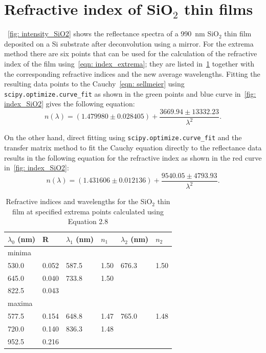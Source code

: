 \section{Refractive index of SiO\texorpdfstring{$_{2}$}{2} thin films}\label{sec: results_index_SiO2}
~\ref{fig: intensity_SiO2} shows the reflectance spectra of a \qty{990}{\nano\meter} SiO$_2$ thin film deposited on a Si substrate after deconvolution using a mirror. For the extrema method there are six points that can be used for the calculation of the refractive index of the film using~\ref{eqn: index_extrema}; they are listed in~\ref{tab: oscillation_SiO2} together with the corresponding refractive indices and the new average wavelengths. Fitting the resulting data points to the Cauchy~\ref{eqn: sellmeier} using \verb|scipy.optimize.curve_fit| as shown in the green points and blue curve in~\ref{fig: index_SiO2} gives the following equation:
\begin{equation} \label{eqn:SiO2_extrema_cauchy} 
    n(\lambda) = (1.479980\pm0.028405) + \frac{3669.94\pm13332.23}{\lambda^2}.
\end{equation}

On the other hand, direct fitting using \verb|scipy.optimize.curve_fit| and the transfer matrix method to fit the Cauchy equation directly to the reflectance data results in the following equation for the refractive index as shown in the red curve in~\ref{fig: index_SiO2}:
\begin{equation} \label{eqn:SiO2_direct_cauchy} 
    n(\lambda) = (1.431606\pm0.012136) + \frac{9540.05\pm4793.93}{\lambda^2}.
\end{equation}

\begin{table}[tbp]
\centering
\begin{tabular}{llllll}
\toprule
$\lambda_0$ (\unit{\nano\meter}) & R     & $\lambda_1$ (\unit{\nano\meter})   & $n_{1}$  & $\lambda_2$ (\unit{\nano\meter})   &  $n_{2}$      \\
\midrule
\multicolumn{6}{l}{minima}                  \\
530.0 & 0.052 & 587.5 & 1.50 & 676.3 & 1.50 \\
645.0 & 0.040 & 733.8 & 1.50 &       &      \\
822.5 & 0.043 &       &      &       &      \\
\midrule
\multicolumn{6}{l}{maxima}                  \\
577.5 & 0.154 & 648.8 & 1.47 & 765.0 & 1.48 \\
720.0 & 0.140 & 836.3 & 1.48 &       &      \\
952.5 & 0.216 &       &      &       &      \\
\bottomrule
\end{tabular}
\caption{Refractive indices and wavelengths for the SiO$_2$ thin film at specified extrema points calculated using Equation 2.8}\label{tab: oscillation_SiO2}
\end{table}

